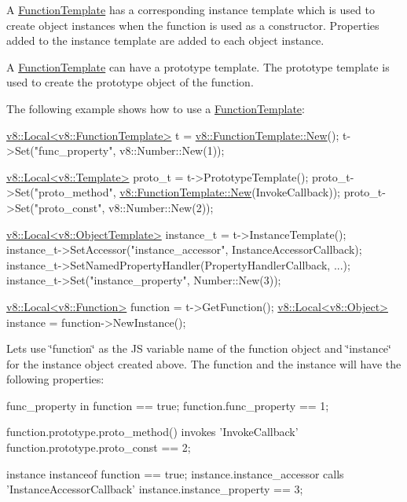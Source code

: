 A \hyperlink{classv8_1_1_function_template}{Function\+Template} has a corresponding instance template which is used to create object instances when the function is used as a constructor. Properties added to the instance template are added to each object instance.

A \hyperlink{classv8_1_1_function_template}{Function\+Template} can have a prototype template. The prototype template is used to create the prototype object of the function.

The following example shows how to use a \hyperlink{classv8_1_1_function_template}{Function\+Template}\+:


\begin{DoxyCode}
\hyperlink{classv8_1_1_local}{v8::Local<v8::FunctionTemplate>} t = 
      \hyperlink{classv8_1_1_function_template_aca42d56ea5d491bd7beacfd513b13555}{v8::FunctionTemplate::New}();
t->Set(\textcolor{stringliteral}{"func\_property"}, v8::Number::New(1));

\hyperlink{classv8_1_1_local}{v8::Local<v8::Template>} proto\_t = t->PrototypeTemplate();
proto\_t->Set(\textcolor{stringliteral}{"proto\_method"}, \hyperlink{classv8_1_1_function_template_aca42d56ea5d491bd7beacfd513b13555}{v8::FunctionTemplate::New}(InvokeCallback));
proto\_t->Set(\textcolor{stringliteral}{"proto\_const"}, v8::Number::New(2));

\hyperlink{classv8_1_1_local}{v8::Local<v8::ObjectTemplate>} instance\_t = t->InstanceTemplate();
instance\_t->SetAccessor(\textcolor{stringliteral}{"instance\_accessor"}, InstanceAccessorCallback);
instance\_t->SetNamedPropertyHandler(PropertyHandlerCallback, ...);
instance\_t->Set(\textcolor{stringliteral}{"instance\_property"}, Number::New(3));

\hyperlink{classv8_1_1_local}{v8::Local<v8::Function>} \textcolor{keyword}{function} = t->GetFunction();
\hyperlink{classv8_1_1_local}{v8::Local<v8::Object>} instance = \textcolor{keyword}{function}->NewInstance();
\end{DoxyCode}


Let\textquotesingle{}s use \char`\"{}function\char`\"{} as the J\+S variable name of the function object and \char`\"{}instance\char`\"{} for the instance object created above. The function and the instance will have the following properties\+:


\begin{DoxyCode}
func\_property in \textcolor{keyword}{function} == \textcolor{keyword}{true};
\textcolor{keyword}{function}.func\_property == 1;

\textcolor{keyword}{function}.prototype.proto\_method() invokes \textcolor{stringliteral}{'InvokeCallback'}
\textcolor{keyword}{function}.prototype.proto\_const == 2;

instance instanceof \textcolor{keyword}{function} == \textcolor{keyword}{true};
instance.instance\_accessor calls \textcolor{stringliteral}{'InstanceAccessorCallback'}
instance.instance\_property == 3;
\end{DoxyCode}


